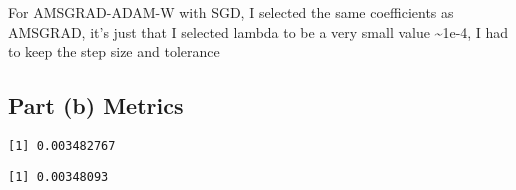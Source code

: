 \documentclass[
  letterpaper,
  DIV=11,
  numbers=noendperiod]{scrartcl}
\newenvironment{Shaded}{\begin{snugshade}}{\end{snugshade}}
\newcommand{\AttributeTok}[1]{\textcolor[rgb]{0.40,0.45,0.13}{#1}}
\newcommand{\DecValTok}[1]{\textcolor[rgb]{0.68,0.00,0.00}{#1}}
\newcommand{\FunctionTok}[1]{\textcolor[rgb]{0.28,0.35,0.67}{#1}}
\newcommand{\NormalTok}[1]{\textcolor[rgb]{0.00,0.23,0.31}{#1}}
\newcommand{\OtherTok}[1]{\textcolor[rgb]{0.00,0.23,0.31}{#1}}
\newcommand{\SpecialCharTok}[1]{\textcolor[rgb]{0.37,0.37,0.37}{#1}}
\begin{document}
For AMSGRAD-ADAM-W with SGD, I selected the same coefficients as
AMSGRAD, it's just that I selected lambda to be a very small value
\textasciitilde1e-4, I had to keep the step size and tolerance

\subsection{Part (b) Metrics}\label{part-b-metrics}

\begin{Shaded}
\end{Shaded}

\begin{verbatim}
[1] 0.003482767
\end{verbatim}

\begin{Shaded}
\end{Shaded}

\begin{verbatim}
[1] 0.00348093
\end{verbatim}

\begin{Shaded}
\end{Shaded}
\end{document}
